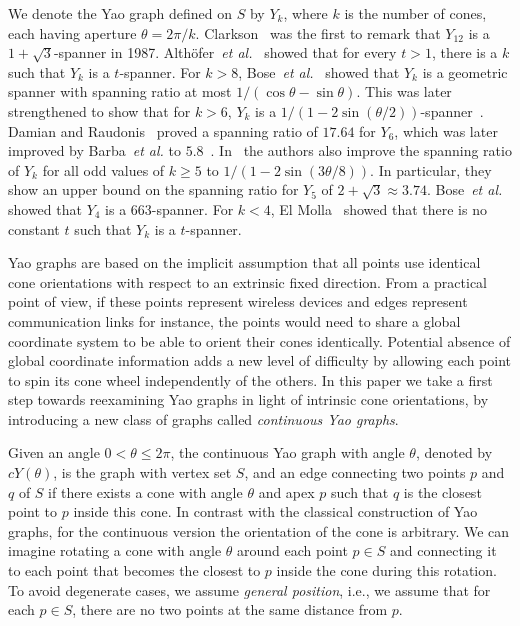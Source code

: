 \documentclass{cccg14}
\newcommand{\etal}{\emph{et al.}\xspace}
\newcommand{\cyao}{\ensuremath{cY(\theta)}\xspace}
\begin{document}
We denote the Yao graph defined on $S$ by $Y_k$, where $k$ is the number of cones, each having aperture $\theta = 2\pi/k$.
Clarkson~\cite{clarkson1987approximation} was the first to remark that $Y_{12}$ is a $1 + \sqrt{3}$-spanner in 1987.
Alth{\"o}fer~\etal~\cite{althofer1993sparse} showed that for every $t > 1$, there is a $k$ such that $Y_k$ is a $t$-spanner. 
For $k > 8$, Bose~\etal~\cite{bose2004approximating} showed that $Y_k$ is a geometric spanner with spanning ratio at most $1 / (\cos \theta - \sin \theta)$. 
This was later strengthened to show that for $k>6$, $Y_k$ is a $1/(1-2\sin(\theta/2))$-spanner~\cite{bose2012piArxiv}. 
Damian and Raudonis~\cite{damian2012yao} proved a spanning ratio of $17.64$ for $Y_6$, which was later improved by Barba~\etal to $5.8$~\cite{barba2014new}. In~\cite{barba2014new} the authors also improve the spanning ratio of $Y_k$ for all odd values of $k\geq 5$ to $1/(1-2\sin (3\theta/8))$. In particular, they show an upper bound on the spanning ratio for $Y_5$ of $2+\sqrt{3}\approx 3.74$.
Bose~\etal~\cite{bose2012pi} showed that $Y_4$ is a $663$-spanner. For $k < 4$, El Molla~\cite{el2009yao} showed that there is no constant $t$ such that $Y_k$ is a $t$-spanner. 

Yao graphs are based on the implicit assumption that all points use identical cone orientations with respect to an extrinsic fixed direction. From a practical point of view, if these points represent wireless devices and edges represent communication links for instance, the points would need to share a global coordinate system to be able to orient their cones identically. Potential absence of global coordinate information adds a new level of difficulty by allowing each point to spin its cone wheel independently of the others. In this paper we take a first step towards reexamining Yao graphs in light of intrinsic cone orientations, by introducing a new class of graphs called \emph{continuous Yao graphs}.

Given an angle $0< \theta\leq 2\pi$, the continuous Yao graph with angle $\theta$, denoted by $\cyao$, is the graph with vertex set $S$, and an edge connecting two points $p$ and $q$ of $S$ if there exists a cone with angle $\theta$ and apex $p$ such that $q$ is the closest point to $p$ inside this cone. In contrast with the classical construction of Yao graphs, for the continuous version the orientation of the cone is arbitrary. We can imagine rotating a cone with angle $\theta$ around each point $p\in S$ and connecting it to each point that becomes the closest to $p$ inside the cone during this rotation. To avoid degenerate cases, we assume \emph{general position}, i.e., we assume that for each $p\in S$, there are no two points at the same distance from $p$.
\end{document}
